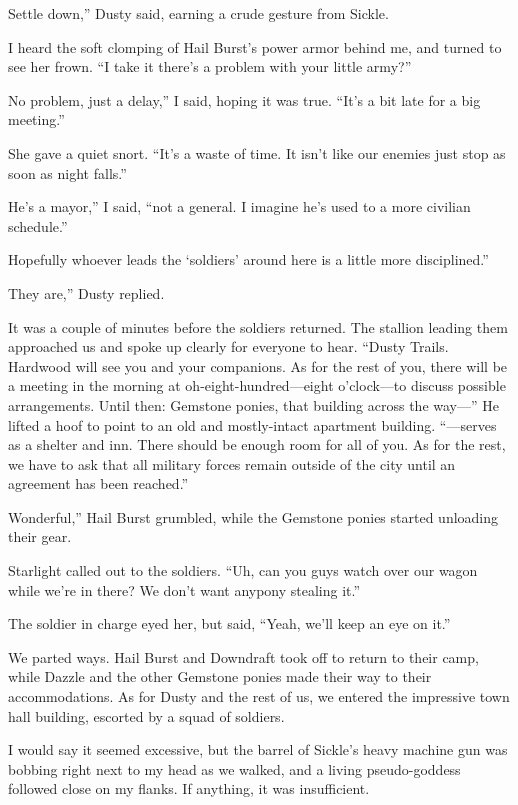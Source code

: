 \leavevmode{}Settle down,” Dusty said, earning a crude gesture from Sickle.

I heard the soft clomping of Hail Burst’s power armor behind me, and turned to see her frown. “I take it there’s a problem with your little army?”

\leavevmode{}No problem, just a delay,” I said, hoping it was true. “It’s a bit late for a big meeting.”

She gave a quiet snort. “It’s a waste of time. It isn’t like our enemies just stop as soon as night falls.”

\leavevmode{}He’s a mayor,” I said, “not a general. I imagine he’s used to a more civilian schedule.”

\leavevmode{}Hopefully whoever leads the ‘soldiers’ around here is a little more disciplined.”

\leavevmode{}They are,” Dusty replied.

It was a couple of minutes before the soldiers returned. The stallion leading them approached us and spoke up clearly for everyone to hear. “Dusty Trails. Hardwood will see you and your companions. As for the rest of you, there will be a meeting in the morning at oh-eight-hundred—eight o’clock—to discuss possible arrangements. Until then: Gemstone ponies, that building across the way—” He lifted a hoof to point to an old and mostly-intact apartment building. “—serves as a shelter and inn. There should be enough room for all of you. As for the rest, we have to ask that all military forces remain outside of the city until an agreement has been reached.”

\leavevmode{}Wonderful,” Hail Burst grumbled, while the Gemstone ponies started unloading their gear.

Starlight called out to the soldiers. “Uh, can you guys watch over our wagon while we’re in there? We don’t want anypony stealing it.”

The soldier in charge eyed her, but said, “Yeah, we’ll keep an eye on it.”

We parted ways. Hail Burst and Downdraft took off to return to their camp, while Dazzle and the other Gemstone ponies made their way to their accommodations. As for Dusty and the rest of us, we entered the impressive town hall building, escorted by a squad of soldiers.

I would say it seemed excessive, but the barrel of Sickle’s heavy machine gun was bobbing right next to my head as we walked, and a living pseudo-goddess followed close on my flanks. If anything, it was insufficient.

